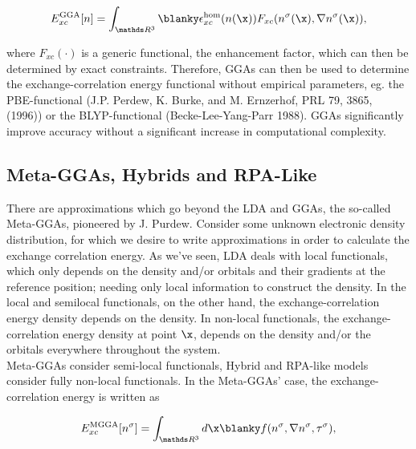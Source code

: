 \documentclass{homework}
\begin{document}
\begin{equation}
    E_{xc}^{\textnormal{GGA}}[n] = \int_{\R^3} \blanky \epsilon_{xc}^{\textnormal{hom}}(n(\x)) F_{xc} (n^{\sigma}(\x), \nabla n^{\sigma}(\x)),
\end{equation}

where $F_{xc}(\cdot)$ is a generic functional, the enhancement factor, which can then be determined by exact constraints. Therefore, GGAs can then be used to determine the exchange-correlation energy functional without empirical parameters, eg. the PBE-functional (J.P. Perdew, K. Burke, and M. Ernzerhof, PRL 79, 3865, (1996)) or the BLYP-functional (Becke-Lee-Yang-Parr 1988). GGAs significantly improve accuracy without a significant increase in computational complexity. \\

\subsection{Meta-GGAs, Hybrids and RPA-Like}

There are approximations which go beyond the LDA and GGAs, the so-called Meta-GGAs, pioneered by J. Purdew. Consider some unknown electronic density distribution, for which we desire to write approximations in order to calculate the exchange correlation energy. As we've seen, LDA deals with local functionals, which only depends on the density and/or orbitals and their gradients at the reference position; needing only local information to construct the density. In the local and semilocal functionals, on the other hand, the exchange-correlation energy density depends on the density. In non-local functionals, the exchange-correlation energy density at point $\x$, depends on the density and/or the orbitals everywhere throughout the system. \\

Meta-GGAs consider semi-local functionals, Hybrid and RPA-like models consider fully non-local functionals. In the Meta-GGAs' case, the exchange-correlation energy is written as 

\begin{equation}
    E_{xc}^{\textnormal{MGGA}}[n^\sigma] = \int_{\R^3} d\x \blanky f(n^\sigma, \nabla n^\sigma, \tau^\sigma),
\end{equation}
\end{document}
